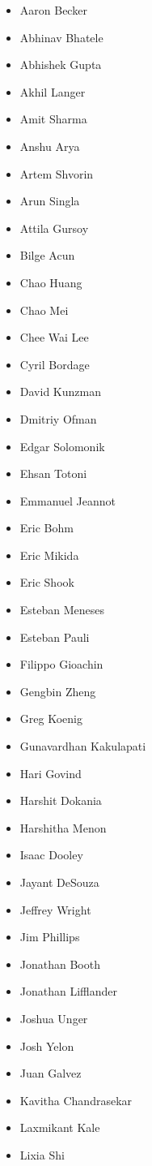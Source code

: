 \begin{itemize}
\item Aaron Becker
\item Abhinav Bhatele
\item Abhishek Gupta
\item Akhil Langer
\item Amit Sharma
\item Anshu Arya
\item Artem Shvorin
\item Arun Singla
\item Attila Gursoy
\item Bilge Acun
\item Chao Huang
\item Chao Mei
\item Chee Wai Lee
\item Cyril Bordage
\item David Kunzman
\item Dmitriy Ofman
\item Edgar Solomonik
\item Ehsan Totoni
\item Emmanuel Jeannot
\item Eric Bohm
\item Eric Mikida
\item Eric Shook
\item Esteban Meneses
\item Esteban Pauli
\item Filippo Gioachin
\item Gengbin Zheng
\item Greg Koenig
\item Gunavardhan Kakulapati
\item Hari Govind
\item Harshit Dokania
\item Harshitha Menon
\item Isaac Dooley
\item Jayant DeSouza
\item Jeffrey Wright
\item Jim Phillips
\item Jonathan Booth
\item Jonathan Lifflander
\item Joshua Unger
\item Josh Yelon
\item Juan Galvez
\item Kavitha Chandrasekar
\item Laxmikant Kale
\item Lixia Shi

\end{itemize}
